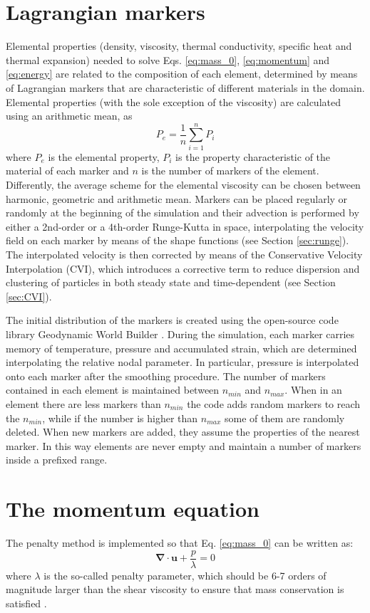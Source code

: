 \documentclass[hidelinks,10pt,a4paper]{article}
\begin{document}
\section{Lagrangian markers}\label{sec:markers}
Elemental properties (density, viscosity, thermal conductivity, specific heat and thermal expansion) needed to solve Eqs. \ref{eq:mass_0}, \ref{eq:momentum}
and \ref{eq:energy} are related to the composition of each element, determined by means of Lagrangian markers that are characteristic of different materials
in the domain. Elemental properties (with the sole exception of the viscosity) are calculated using an arithmetic mean, as \[P_e=\frac{1}{n}\sum_{i=1}^n P_i\]
where $P_e$ is the elemental property, $P_i$ is the property characteristic of the material of each marker and $n$ is the number of markers of the element.
Differently, the average scheme for the elemental viscosity can be chosen between harmonic, geometric and arithmetic mean. Markers can be placed regularly or
randomly at the beginning of the simulation and their advection is performed by either a 2nd-order or a 4th-order Runge-Kutta in space, interpolating the velocity 
field on each marker by means of the shape functions (see Section \ref{sec:runge}). The interpolated velocity is then corrected by means of the Conservative
Velocity Interpolation (CVI), which introduces a corrective term to reduce dispersion and clustering of particles in both steady state and time-dependent 
\citep{Wang2015} (see Section \ref{sec:CVI}).

The initial distribution of the markers is created using the open-source code library
Geodynamic World Builder \citep{Fraters2019}. During the simulation, each marker carries memory of temperature, pressure and accumulated strain, which are
determined interpolating the relative nodal parameter. In particular, pressure is interpolated onto each marker after the smoothing procedure. The number
of markers contained in each element is maintained between $n_{min}$ and $n_{max}$. When in an element there are less markers than $n_{min}$ the code adds
random markers to reach the $n_{min}$, while if the number is higher than $n_{max}$ some of them are randomly deleted. When new markers are added, they assume
the properties of the nearest marker. In this way elements are never empty and maintain a number of markers inside a prefixed range.

\section{The momentum equation}\label{sec:mom_eq}
The penalty method is implemented so that Eq. \ref{eq:mass_0} can be written as:
\begin{equation}\label{eq:mass_penalty}
\bm{\nabla} \cdot \bm{u} + \frac{p}{\lambda}=0
\end{equation}
where $\lambda$ is the so-called penalty parameter, which should be 6-7 orders of magnitude larger than the shear viscosity to ensure that mass conservation
is satisfied \citep{Donea2003,Thieulot2014}.
\end{document}

